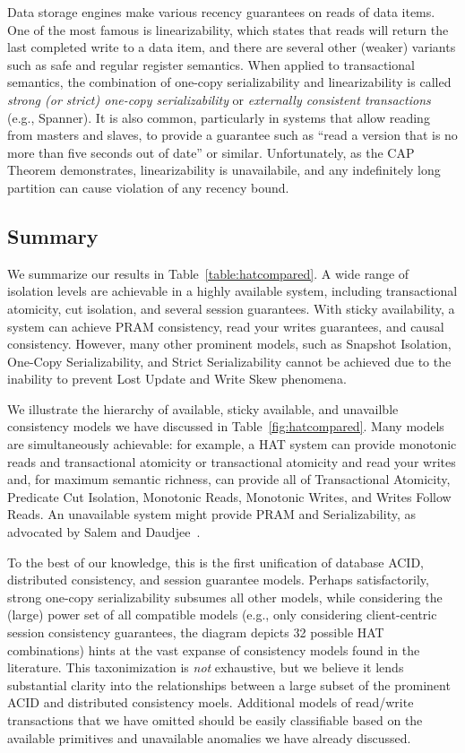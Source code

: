 Data storage engines make various recency guarantees on reads of data
items. One of the most famous is linearizability, which states that
reads will return the last completed write to a data item, and there
are several other (weaker) variants such as safe and regular register
semantics. When applied to transactional semantics, the combination of
one-copy serializability and linearizability is called \textit{strong
  (or strict) one-copy serializability} or \textit{externally
  consistent transactions} (e.g., Spanner). It is also common,
particularly in systems that allow reading from masters and slaves, to
provide a guarantee such as ``read a version that is no more than five
seconds out of date'' or similar. Unfortunately, as the CAP Theorem
demonstrates, linearizability is unavailabile, and any indefinitely
long partition can cause violation of any recency bound.

\subsection{Summary}
\label{sec:hat-summary}

We summarize our results in Table~\ref{table:hatcompared}. A wide
range of isolation levels are achievable in a highly available system,
including transactional atomicity, cut isolation, and several session
guarantees. With sticky availability, a system can achieve PRAM
consistency, read your writes guarantees, and causal
consistency. However, many other prominent models, such as Snapshot
Isolation, One-Copy Serializability, and Strict Serializability cannot
be achieved due to the inability to prevent Lost Update and Write Skew phenomena.

We illustrate the hierarchy of available, sticky available, and
unavailble consistency models we have discussed in
Table~\ref{fig:hatcompared}. Many models are simultaneously
achievable: for example, a HAT system can provide monotonic reads and
transactional atomicity or transactional atomicity and read your
writes and, for maximum semantic richness, can provide all of
Transactional Atomicity, Predicate Cut Isolation, Monotonic Reads,
Monotonic Writes, and Writes Follow Reads. An unavailable system might
provide PRAM and Serializability, as advocated by Salem and
Daudjee~\cite{needed}.

To the best of our knowledge, this is the first unification of
database ACID, distributed consistency, and session guarantee
models. Perhaps satisfactorily, strong one-copy serializability
subsumes all other models, while considering the (large) power set of
all compatible models (e.g., only considering client-centric session
consistency guarantees, the diagram depicts 32 possible HAT
combinations) hints at the vast expanse of consistency models found in
the literature. This taxonimization is \textit{not} exhaustive, but we
believe it lends substantial clarity into the relationships between a
large subset of the prominent ACID and distributed consistency
moels. Additional models of read/write transactions that we have
omitted should be easily classifiable based on the available
primitives and unavailable anomalies we have already discussed.


